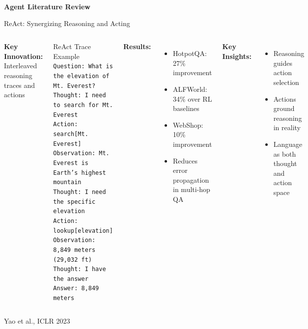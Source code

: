 \documentclass[aspectratio=169]{beamer}
\begin{document}
\begin{frame}
	\begin{center}
		\Large
		\textbf{Agent Literature Review}
	\end{center}
\end{frame}

\begin{frame}{ReAct: Synergizing Reasoning and Acting}
	\begin{columns}
		\textbf{Key Innovation:} Interleaved reasoning traces and actions
		
		\begin{block}{ReAct Trace Example}
			\footnotesize
			\texttt{Question: What is the elevation of Mt. Everest?}\\
			\texttt{Thought: I need to search for Mt. Everest}\\
			\texttt{Action: search[Mt. Everest]}\\
			\texttt{Observation: Mt. Everest is Earth's highest mountain}\\
			\texttt{Thought: I need the specific elevation}\\
			\texttt{Action: lookup[elevation]}\\
			\texttt{Observation: 8,849 meters (29,032 ft)}\\
			\texttt{Thought: I have the answer}\\
			\texttt{Answer: 8,849 meters}
		\end{block}
		
		\textbf{Results:}
		\begin{itemize}
			\item HotpotQA: {\color{highlight}27\% improvement}
			\item ALFWorld: {\color{highlight}34\% over RL baselines}
			\item WebShop: {\color{highlight}10\% improvement}
			\item Reduces error propagation in multi-hop QA
		\end{itemize}
		
		\textbf{Key Insights:}
		\begin{itemize}
			\item Reasoning guides action selection
			\item Actions ground reasoning in reality
			\item Language as both thought and action space
		\end{itemize}
	\end{columns}
	
	\vspace{0.2cm}
	\small
	Yao et al., ICLR 2023
\end{frame}
\end{document}
